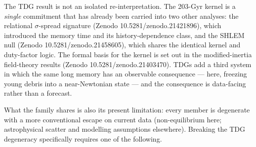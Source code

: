 \documentclass[
]{article}
\begin{document}
The TDG result is not an isolated re-interpretation. The 203-Gyr kernel
is a \emph{single} commitment that has already been carried into two
other analyses: the relational \(\sigma\)-spread signature (Zenodo
10.5281/zenodo.21421896), which introduced the memory time and its
history-dependence class, and the SHLEM null (Zenodo
10.5281/zenodo.21458605), which shares the identical kernel and
duty-factor logic. The formal basis for the kernel is set out in the
modified-inertia field-theory results (Zenodo 10.5281/zenodo.21403470).
TDGs add a third system in which the same long memory has an observable
consequence --- here, freezing young debris into a near-Newtonian state
--- and the consequence is data-facing rather than a forecast.

What the family shares is also its present limitation: every member is
degenerate with a more conventional escape on current data
(non-equilibrium here; astrophysical scatter and modelling assumptions
elsewhere). Breaking the TDG degeneracy specifically requires one of the
following.
\end{document}
